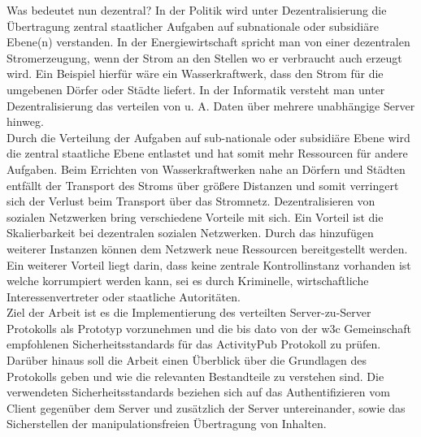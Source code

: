 {	Was bedeutet nun dezentral? In der Politik wird unter Dezentralisierung \glqq die Übertragung zentral staatlicher Aufgaben auf subnationale oder subsidiäre Ebene(n) verstanden\grqq\cite{wikipedia-dezentralisierung-politik}. In der Energiewirtschaft spricht man von einer \glqq dezentralen Stromerzeugung\grqq, wenn der Strom an den Stellen wo er verbraucht auch erzeugt wird. Ein Beispiel hierfür wäre ein Wasserkraftwerk, dass den Strom für die umgebenen Dörfer oder Städte liefert\cite{wikipedia-dezentralisierung-energie}. In der Informatik versteht man unter Dezentralisierung das verteilen von u. A. Daten über mehrere unabhängige Server hinweg.\\
	
	Durch die Verteilung der Aufgaben auf sub-nationale oder subsidiäre Ebene wird die zentral staatliche Ebene entlastet und hat somit mehr Ressourcen für andere Aufgaben. Beim Errichten von Wasserkraftwerken nahe an Dörfern und Städten entfällt der Transport des Stroms über größere Distanzen und somit verringert sich der Verlust beim Transport über das Stromnetz. Dezentralisieren von sozialen Netzwerken bring verschiedene Vorteile mit sich. Ein Vorteil ist die Skalierbarkeit bei dezentralen sozialen Netzwerken. Durch das hinzufügen weiterer Instanzen können dem Netzwerk neue Ressourcen bereitgestellt werden. Ein weiterer Vorteil liegt darin, dass keine zentrale Kontrollinstanz vorhanden ist welche korrumpiert werden kann, sei es durch Kriminelle, wirtschaftliche Interessenvertreter oder staatliche Autoritäten.\\
	
	Ziel der Arbeit ist es die Implementierung des verteilten Server-zu-Server Protokolls als Prototyp vorzunehmen und die bis dato von der \gls{w3c} Gemeinschaft empfohlenen Sicherheitsstandards für das ActivityPub Protokoll zu prüfen. Darüber hinaus soll die Arbeit einen Überblick über die Grundlagen des Protokolls geben und wie die relevanten Bestandteile zu verstehen sind. Die verwendeten Sicherheitsstandards beziehen sich auf das Authentifizieren vom Client gegenüber dem Server und zusätzlich der Server untereinander, sowie das Sicherstellen der manipulationsfreien Übertragung von Inhalten.\\
		
	
}

